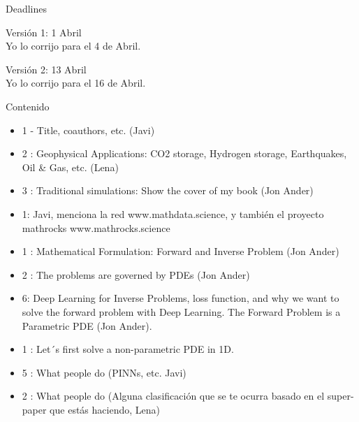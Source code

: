 \begin{frame}{Deadlines}

Versión 1: 1 Abril\\
Yo lo corrijo para el 4 de Abril.
\vspace{2cm}

Versión 2: 13 Abril\\
Yo lo corrijo para el 16 de Abril.

\end{frame}
\begin{frame}{Contenido}

\begin{itemize}
\item 1 - Title, coauthors, etc. (Javi)
\item 2 :  Geophysical Applications: CO2 storage, Hydrogen storage, Earthquakes, Oil \& Gas, etc. (Lena)
\item 3 : Traditional simulations: Show the cover of my book (Jon Ander)
\item 1: Javi, menciona la red www.mathdata.science, y también el proyecto mathrocks www.mathrocks.science 
\item 1 :  Mathematical Formulation: Forward and Inverse Problem (Jon Ander)
\item 2  : The problems are governed by PDEs (Jon Ander)
\item 6: Deep Learning for Inverse Problems, loss function, and why we want to solve the forward problem with Deep Learning. The Forward Problem is a Parametric PDE (Jon Ander).
\item 1  : Let´s first solve a non-parametric PDE in 1D.
\item 5 : What people do (PINNs, etc. Javi)
\item 2 : What people do (Alguna clasificación que se te ocurra basado en el super-paper que estás haciendo, Lena)
\end{itemize}
\end{frame}


